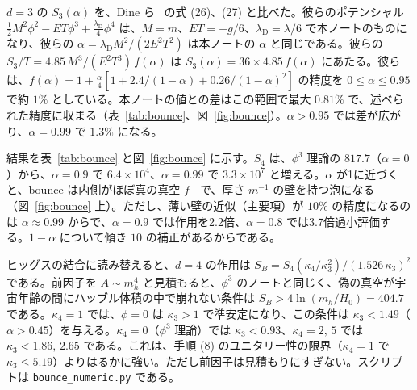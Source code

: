 \documentclass[a4paper,10pt]{ltjsarticle}
\begin{document}
$d=3$ の $S_3(\alpha)$ を、Dine ら~\cite{dine92} の式 (26)、(27) と比べた。彼らのポテンシャル $\frac12M^2\phi^2-ET\phi^3+\frac{\lambda_{\mathrm D}}4\phi^4$ は、$M=m$、$ET=-g/6$、$\lambda_{\mathrm D}=\lambda/6$ で本ノートのものになり、彼らの $\alpha=\lambda_{\mathrm D}M^2/(2E^2T^2)$ は本ノートの $\alpha$ と同じである。彼らの $S_3/T=4.85\,M^3/(E^2T^3)\,f(\alpha)$ は $S_3(\alpha)=36\times4.85\,f(\alpha)$ にあたる。彼らは、$f(\alpha)=1+\frac\alpha4[1+2.4/(1-\alpha)+0.26/(1-\alpha)^2]$ の精度を $0\le\alpha\le0.95$ で約 $1\%$ としている。本ノートの値との差はこの範囲で最大 $0.81\%$ で、述べられた精度に収まる（表~\ref{tab:bounce}、図~\ref{fig:bounce}）。$\alpha>0.95$ では差が広がり、$\alpha=0.99$ で $1.3\%$ になる。

結果を表~\ref{tab:bounce} と図~\ref{fig:bounce} に示す。$S_4$ は、$\phi^3$ 理論の $817.7$（$\alpha=0$）から、$\alpha=0.9$ で $6.4\times10^4$、$\alpha=0.99$ で $3.3\times10^7$ と増える。$\alpha$ が1に近づくと、bounce は内側がほぼ真の真空 $f_-$ で、厚さ $m^{-1}$ の壁を持つ泡になる（図~\ref{fig:bounce} 上）。ただし、薄い壁の近似（主要項）が $10\%$ の精度になるのは $\alpha\approx0.99$ からで、$\alpha=0.9$ では作用を2.2倍、$\alpha=0.8$ では3.7倍過小評価する。$1-\alpha$ について傾き $10$ の補正があるからである。

ヒッグスの結合に読み替えると、$d=4$ の作用は $S_B=S_4(\kappa_4/\kappa_3^2)/(1.526\,\kappa_3)^2$ である。前因子を $A\sim m_h^4$ と見積もると、$\phi^3$ のノートと同じく、偽の真空が宇宙年齢の間にハッブル体積の中で崩れない条件は $S_B>4\ln(m_h/H_0)=404.7$ である。$\kappa_4=1$ では、$\phi=0$ は $\kappa_3>1$ で準安定になり、この条件は $\kappa_3<1.49$（$\alpha>0.45$）を与える。$\kappa_4=0$（$\phi^3$ 理論）では $\kappa_3<0.93$、$\kappa_4=2,\,5$ では $\kappa_3<1.86,\,2.65$ である。これは、手順 (8) のユニタリー性の限界（$\kappa_4=1$ で $\kappa_3\le5.19$）よりはるかに強い。ただし前因子は見積もりにすぎない。スクリプトは \texttt{bounce\_numeric.py} である。
\end{document}
